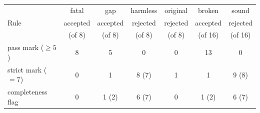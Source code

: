 \begin{tabular}{@{}lcccccc@{}}
\toprule
 & fatal & gap & harmless & original & broken & sound \\
Rule & accepted & accepted & rejected & rejected & accepted & rejected \\
 & (of 8) & (of 8) & (of 8) & (of 8) & (of 16) & (of 16) \\
\midrule
pass mark ($\ge 5$) & 8 & 5 & 0 & 0 & 13 & 0 \\
strict mark ($=7$) & 0 & 1 & 8 (7) & 1 & 1 & 9 (8) \\
completeness flag & 0 & 1 (2) & 6 (7) & 0 & 1 (2) & 6 (7) \\
\bottomrule
\end{tabular}
